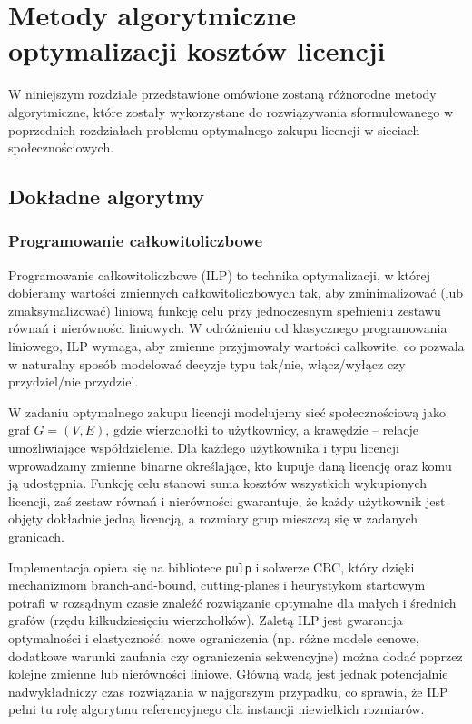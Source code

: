 \chapter{Metody algorytmiczne optymalizacji kosztów licencji}

W niniejszym rozdziale przedstawione omówione zostaną różnorodne metody algorytmiczne, które zostały wykorzystane do rozwiązywania sformułowanego w poprzednich rozdziałach problemu optymalnego zakupu licencji w sieciach społecznościowych.

\section{Dokładne algorytmy}

\subsection{Programowanie całkowitoliczbowe}

Programowanie całkowitoliczbowe (ILP) to technika optymalizacji, w której dobieramy wartości zmiennych całkowitoliczbowych tak, aby zminimalizować (lub zmaksymalizować) liniową funkcję celu przy jednoczesnym spełnieniu zestawu równań i nierówności liniowych. W odróżnieniu od klasycznego programowania liniowego, ILP wymaga, aby zmienne przyjmowały wartości całkowite, co pozwala w naturalny sposób modelować decyzje typu tak/nie, włącz/wyłącz czy przydziel/nie przydziel.

W zadaniu optymalnego zakupu licencji modelujemy sieć społecznościową jako graf $G=(V,E)$, gdzie wierzchołki to użytkownicy, a krawędzie – relacje umożliwiające współdzielenie. Dla każdego użytkownika i typu licencji wprowadzamy zmienne binarne określające, kto kupuje daną licencję oraz komu ją udostępnia. Funkcję celu stanowi suma kosztów wszystkich wykupionych licencji, zaś zestaw równań i nierówności gwarantuje, że każdy użytkownik jest objęty dokładnie jedną licencją, a rozmiary grup mieszczą się w zadanych granicach.

Implementacja opiera się na bibliotece \texttt{pulp} i solwerze CBC, który dzięki mechanizmom branch-and-bound, cutting-planes i heurystykom startowym potrafi w rozsądnym czasie znaleźć rozwiązanie optymalne dla małych i średnich grafów (rzędu kilkudziesięciu wierzchołków). Zaletą ILP jest gwarancja optymalności i elastyczność: nowe ograniczenia (np. różne modele cenowe, dodatkowe warunki zaufania czy ograniczenia sekwencyjne) można dodać poprzez kolejne zmienne lub nierówności liniowe. Główną wadą jest jednak potencjalnie nadwykładniczy czas rozwiązania w najgorszym przypadku, co sprawia, że ILP pełni tu rolę algorytmu referencyjnego dla instancji niewielkich rozmiarów.


